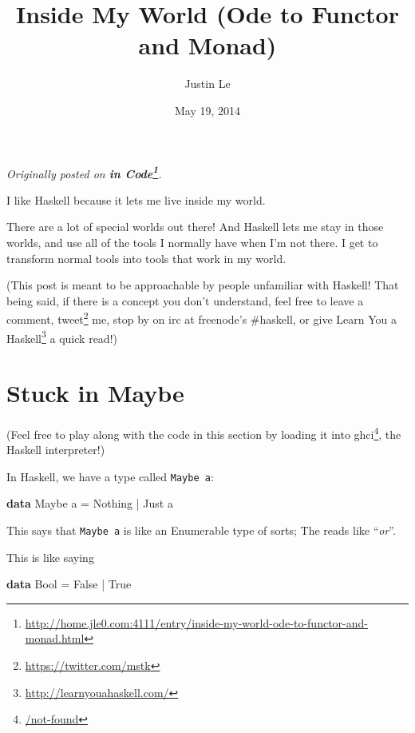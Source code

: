 \documentclass[]{article}
\title{Inside My World (Ode to Functor and Monad)}
\author{Justin Le}
\date{May 19, 2014}
\newenvironment{Shaded}{}{}
\newcommand{\KeywordTok}[1]{\textcolor[rgb]{0.00,0.44,0.13}{\textbf{{#1}}}}
\newcommand{\DataTypeTok}[1]{\textcolor[rgb]{0.56,0.13,0.00}{{#1}}}
\newcommand{\FunctionTok}[1]{\textcolor[rgb]{0.02,0.16,0.49}{{#1}}}
\newcommand{\NormalTok}[1]{{#1}}
\renewcommand{\href}[2]{#2\footnote{\url{#1}}}
\begin{document}
\maketitle

\emph{Originally posted on
\textbf{\href{http://home.jle0.com:4111/entry/inside-my-world-ode-to-functor-and-monad.html}{in
Code}}.}

I like Haskell because it lets me live inside my world.

There are a lot of special worlds out there! And Haskell lets me stay in
those worlds, and use all of the tools I normally have when I'm not
there. I get to transform normal tools into tools that work in my world.

(This post is meant to be approachable by people unfamiliar with
Haskell! That being said, if there is a concept you don't understand,
feel free to leave a comment, \href{https://twitter.com/mstk}{tweet} me,
stop by on irc at freenode's \#haskell, or give
\href{http://learnyouahaskell.com/}{Learn You a Haskell} a quick read!)

\section{Stuck in Maybe}\label{stuck-in-maybe}

(Feel free to play along with the code in this section by
\href{/not-found}{loading it into ghci}, the Haskell interpreter!)

In Haskell, we have a type called \texttt{Maybe\ a}:

\begin{Shaded}
\begin{Highlighting}[]
\KeywordTok{data} \DataTypeTok{Maybe} \NormalTok{a }\FunctionTok{=} \DataTypeTok{Nothing} \FunctionTok{|} \DataTypeTok{Just} \NormalTok{a}
\end{Highlighting}
\end{Shaded}

This says that \texttt{Maybe\ a} is like an Enumerable type of sorts;
The \texttt{\textbar{}} reads like ``\emph{or}''.

This is like saying

\begin{Shaded}
\begin{Highlighting}[]
\KeywordTok{data} \DataTypeTok{Bool} \FunctionTok{=} \DataTypeTok{False} \FunctionTok{|} \DataTypeTok{True}
\end{Highlighting}
\end{Shaded}
\end{document}
